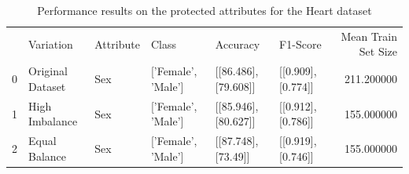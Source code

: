 \begin{table}[p]
\caption{Performance results on the protected attributes for the Heart dataset}
\begin{tabular}{llllllr}
 & Variation & Attribute & Class & Accuracy & F1-Score & Mean Train Set Size \\
0 & Original Dataset & Sex & ['Female', 'Male'] & [[86.486], [79.608]] & [[0.909], [0.774]] & 211.200000 \\
1 & High Imbalance & Sex & ['Female', 'Male'] & [[85.946], [80.627]] & [[0.912], [0.786]] & 155.000000 \\
2 & Equal Balance & Sex & ['Female', 'Male'] & [[87.748], [73.49]] & [[0.919], [0.746]] & 155.000000 \\
\end{tabular}
\end{table}
